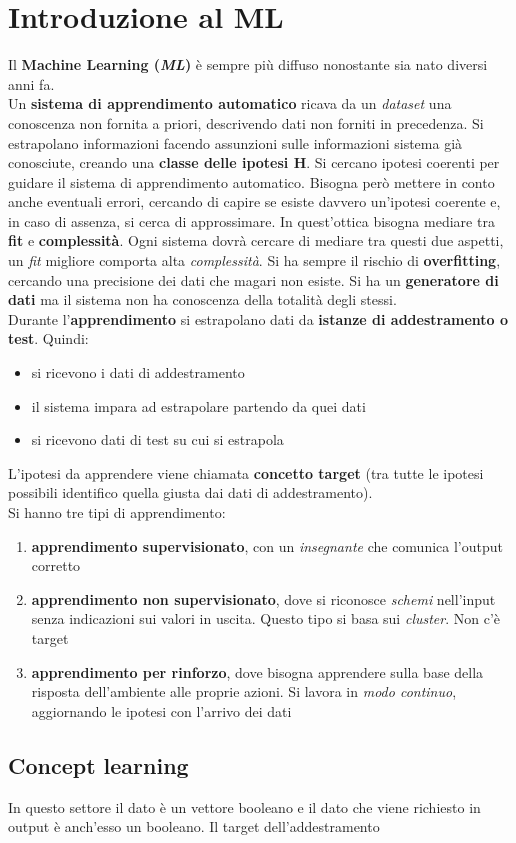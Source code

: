 \documentclass[a4paper,12pt, oneside]{book}
\begin{document}
\chapter{Introduzione al ML}
Il \textbf{Machine Learning (\textit{ML})} è sempre più diffuso nonostante sia
nato diversi anni fa.\\
Un \textbf{sistema di apprendimento automatico} ricava da un \textit{dataset}
una conoscenza non fornita a priori, descrivendo dati non forniti in
precedenza. Si estrapolano informazioni facendo assunzioni sulle informazioni
sistema già conosciute, creando una \textbf{classe delle ipotesi H}. Si cercano
ipotesi coerenti per guidare il sistema di apprendimento automatico. Bisogna
però mettere in conto anche eventuali errori, cercando di capire se esiste
davvero un'ipotesi coerente e, in caso di assenza, si cerca di approssimare. In
quest'ottica bisogna mediare tra \textbf{fit} e \textbf{complessità}. Ogni
sistema dovrà cercare di mediare tra questi due aspetti, un \textit{fit}
migliore comporta alta \textit{complessità}. Si ha sempre il rischio di
\textbf{overfitting}, cercando una precisione dei dati che magari non esiste. Si
ha un \textbf{generatore di dati} ma il sistema non ha conoscenza della totalità
degli stessi.\\
Durante l'\textbf{apprendimento} si estrapolano dati da \textbf{istanze di
  addestramento o test}. Quindi:
\begin{itemize}
  \item si ricevono i dati di addestramento
  \item il sistema impara ad estrapolare partendo da quei dati
  \item si ricevono dati di test su cui si estrapola
\end{itemize}
L'ipotesi da apprendere viene chiamata \textbf{concetto target} (tra tutte le
ipotesi possibili identifico quella giusta dai dati di addestramento).\\
Si hanno tre tipi di apprendimento:
\begin{enumerate}
  \item \textbf{apprendimento supervisionato}, con un \textit{insegnante} che
  comunica  l'output corretto
  \item \textbf{apprendimento non supervisionato}, dove si riconosce
  \textit{schemi} nell'input senza indicazioni sui valori in uscita. Questo tipo
  si basa sui \textit{cluster}. Non c'è target
  \item \textbf{apprendimento per rinforzo}, dove bisogna apprendere sulla base
  della risposta dell’ambiente alle proprie azioni. Si lavora in \textit{modo
    continuo}, aggiornando le ipotesi con l'arrivo dei dati
\end{enumerate}
\section{Concept learning}
In questo settore il dato è un vettore booleano e il dato che viene richiesto in
output è anch'esso un booleano. Il target dell'addestramento
\end{document}
